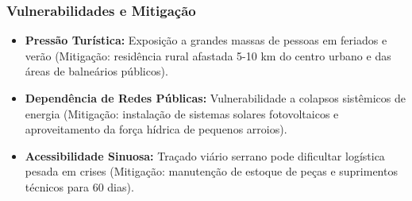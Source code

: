 \subsubsection{Vulnerabilidades e
Mitigação}

\begin{itemize}
\tightlist
\item
  \textbf{Pressão Turística:} Exposição a grandes massas de pessoas em
  feriados e verão (Mitigação: residência rural afastada 5-10 km do
  centro urbano e das áreas de balneários públicos).
\item
  \textbf{Dependência de Redes Públicas:} Vulnerabilidade a colapsos
  sistêmicos de energia (Mitigação: instalação de sistemas solares
  fotovoltaicos e aproveitamento da força hídrica de pequenos arroios).
\item
  \textbf{Acessibilidade Sinuosa:} Traçado viário serrano pode
  dificultar logística pesada em crises (Mitigação: manutenção de
  estoque de peças e suprimentos técnicos para 60 dias).
\end{itemize}

